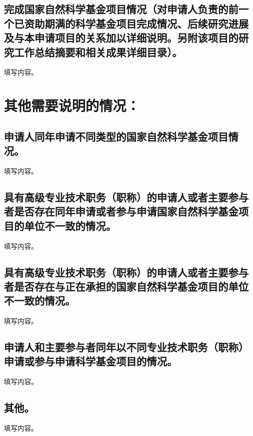 \documentclass[GP]{nsfc}
\begin{document}
\section{\textbf{完成国家自然科学基金项目情况}（对申请人负责的前一个已资助期满的科学基金项目完成情况、后续研究进展及与本申请项目的关系加以详细说明。另附该项目的研究工作总结摘要和相关成果详细目录）。}
填写内容。

\chapter{\textbf{其他需要说明的情况：}}

\section{申请人同年申请不同类型的国家自然科学基金项目情况。}
填写内容。

\section{具有高级专业技术职务（职称）的申请人或者主要参与者是否存在同年申请或者参与申请国家自然科学基金项目的单位不一致的情况。}
填写内容。

\section{具有高级专业技术职务（职称）的申请人或者主要参与者是否存在与正在承担的国家自然科学基金项目的单位不一致的情况。}
填写内容。

\section{申请人和主要参与者同年以不同专业技术职务（职称）申请或参与申请科学基金项目的情况。}
填写内容。

\section{其他。}
填写内容。
\end{document}

